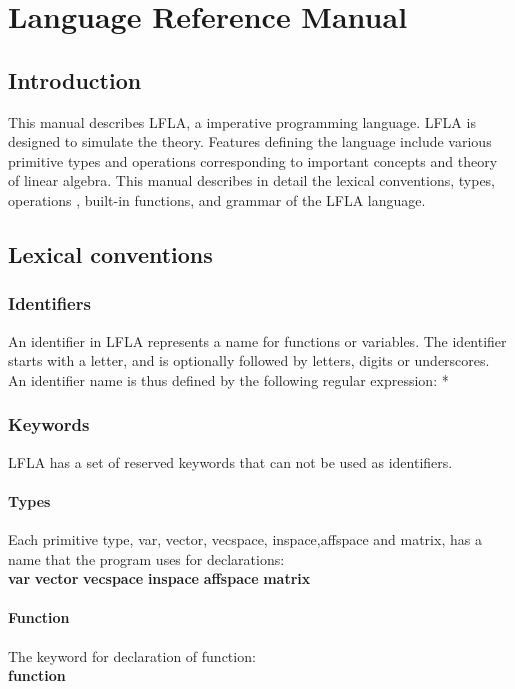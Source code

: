 \documentclass[12pt]{article} %
\begin{document}
\tableofcontents
\newpage

\section{Language Reference Manual}
\subsection{Introduction}
This manual describes LFLA, a imperative programming language.  LFLA is
designed to  simulate the theory. Features defining the language
include  various primitive types and operations  corresponding to important concepts and theory  of  linear algebra. This manual
describes in detail the lexical conventions, types,  operations , built-in functions, and grammar of the LFLA
language.


\subsection{Lexical conventions}

\subsubsection{Identifiers}
An identifier in LFLA represents a name for functions or variables. The identifier starts with a letter, and is optionally followed by letters, digits or underscores. An identifier name is thus defined
by the following regular expression:  
  \newline
['a' - 'z' 'A' -'Z' ] ['a' - 'z' 'A' - 'Z' '0' - '9' '\_']*

\subsubsection{Keywords}
LFLA has a set of reserved keywords that can not be used as identifiers.
\paragraph{Types} Each primitive type, var, vector, vecspace, inspace,affspace and matrix, has a name that the program
uses for declarations:\\
 \textbf{var}  \quad  \textbf{vector}  \quad\textbf{vecspace} \quad\textbf{ inspace} \quad \textbf{affspace} \quad \textbf{matrix}
 \paragraph{Function}The keyword for declaration of  function:\\
\textbf{function}
\end{document}
